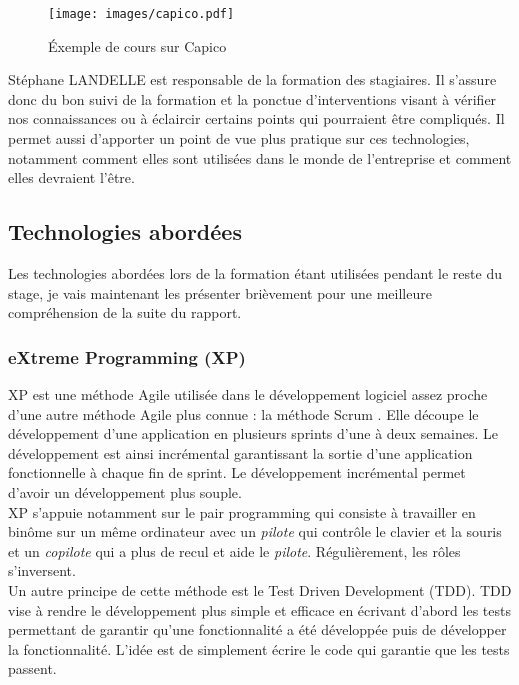 \begin{figure}[H]
	\centering
	\texttt{[image: images/capico.pdf]}
	\caption{Éxemple de cours sur Capico}
\end{figure}

Stéphane LANDELLE est responsable de la formation des stagiaires. Il s'assure donc du bon suivi de la formation et la ponctue d'interventions visant à vérifier nos connaissances ou à éclaircir certains points qui pourraient être compliqués. Il permet aussi d'apporter un point de vue plus pratique sur ces technologies, notamment comment elles sont utilisées dans le monde de l'entreprise et comment elles devraient l'être.

\subsection{Technologies abordées}

Les technologies abordées lors de la formation étant utilisées pendant le reste du stage, je vais maintenant les présenter brièvement pour une meilleure compréhension de la suite du rapport.

\subsubsection{eXtreme Programming (XP)}

XP est une méthode Agile utilisée dans le développement logiciel assez proche d'une autre méthode Agile plus connue : la méthode Scrum \cite{scrum}. Elle découpe le développement d'une application en plusieurs sprints d'une à deux semaines. Le développement est ainsi incrémental garantissant la sortie d'une application fonctionnelle à chaque fin de sprint. Le développement incrémental permet d'avoir un développement plus souple.\\

XP s'appuie notamment sur le pair programming qui consiste à travailler en binôme sur un même ordinateur avec un \emph{pilote} qui contrôle le clavier et la souris et un \emph{copilote} qui a plus de recul et aide le \emph{pilote}. Régulièrement, les rôles s'inversent.\\

Un autre principe de cette méthode est le Test Driven Development (TDD). TDD vise à rendre le développement plus simple et efficace en écrivant d'abord les tests permettant de garantir qu'une fonctionnalité a été développée puis de développer la fonctionnalité. L'idée est de simplement écrire le code qui garantie que les tests passent.

